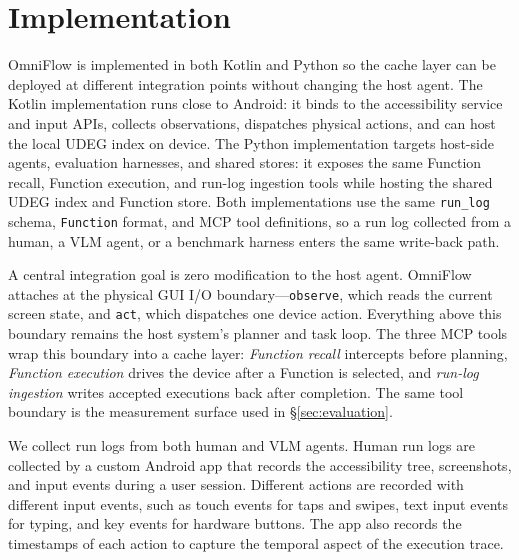 
\section{Implementation}
\label{sec:implementation}
\label{sec:impl-agent}
\label{sec:impl-pagevector}
\label{sec:impl-index}
\label{sec:impl-execution}
\label{sec:impl-transfer}
\label{sec:impl-writeback}

OmniFlow is implemented in both Kotlin and Python so the cache layer can be
deployed at different integration points without changing the host agent.  The
Kotlin implementation runs close to Android: it binds to the accessibility
service and input APIs, collects observations, dispatches physical actions, and
can host the local UDEG index on device.  The Python implementation targets
host-side agents, evaluation harnesses, and shared stores: it exposes the same
Function recall, Function execution, and run-log ingestion tools while hosting
the shared UDEG index and Function store.  Both implementations use the same
\texttt{run\_log} schema, \texttt{Function} format, and MCP tool definitions, so a
run log collected from a human, a VLM agent, or a benchmark harness enters the
same write-back path.

A central integration goal is zero modification to the host agent.  OmniFlow
attaches at the physical GUI I/O boundary---\texttt{observe}, which reads the
current screen state, and \texttt{act}, which dispatches one device action.
Everything above this boundary remains the host system's planner and task loop.
The three MCP tools wrap this boundary into a cache layer: \emph{Function
recall} intercepts before planning, \emph{Function execution} drives the device
after a Function is selected, and \emph{run-log ingestion} writes accepted
executions back after completion.  The same tool boundary is the measurement
surface used in \S\ref{sec:evaluation}.


We collect run logs from both human and VLM agents. Human run logs are collected
by a custom Android app that records the accessibility tree, screenshots, and
input events during a user session. Different actions are recorded with different input events, such as touch events for taps and swipes, text input events for typing, and key events for hardware buttons. The app also records the timestamps of each action to capture the temporal aspect of the execution trace.